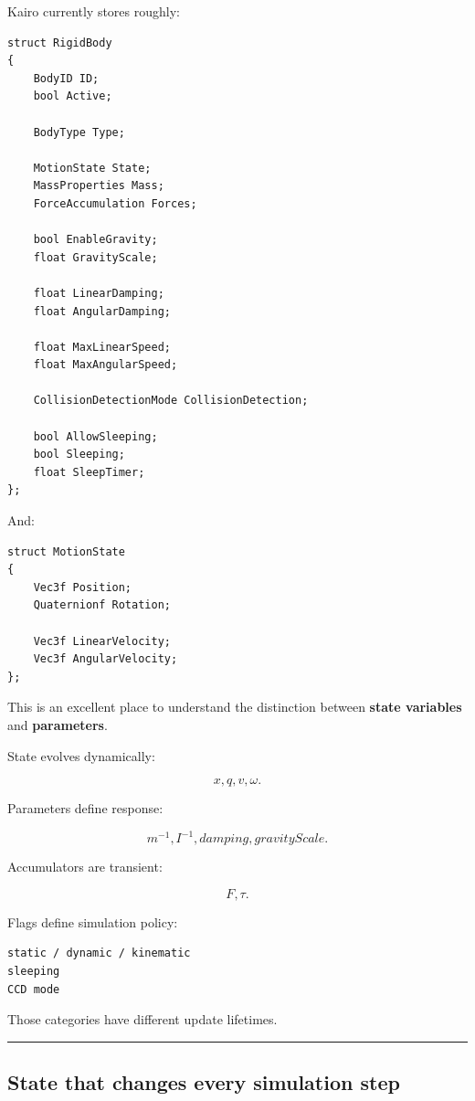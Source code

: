 Kairo currently stores roughly:

\begin{verbatim}
struct RigidBody
{
    BodyID ID;
    bool Active;

    BodyType Type;

    MotionState State;
    MassProperties Mass;
    ForceAccumulation Forces;

    bool EnableGravity;
    float GravityScale;

    float LinearDamping;
    float AngularDamping;

    float MaxLinearSpeed;
    float MaxAngularSpeed;

    CollisionDetectionMode CollisionDetection;

    bool AllowSleeping;
    bool Sleeping;
    float SleepTimer;
};
\end{verbatim}

And:

\begin{verbatim}
struct MotionState
{
    Vec3f Position;
    Quaternionf Rotation;

    Vec3f LinearVelocity;
    Vec3f AngularVelocity;
};
\end{verbatim}

This is an excellent place to understand the distinction between \textbf{state variables} and \textbf{parameters}.

State evolves dynamically:

\[
x,q,v,\omega.
\]

Parameters define response:

\[
m^{-1},I^{-1},damping,gravityScale.
\]

Accumulators are transient:

\[
F,\tau.
\]

Flags define simulation policy:

\begin{verbatim}
static / dynamic / kinematic
sleeping
CCD mode
\end{verbatim}

Those categories have different update lifetimes.

\begin{center}\rule{0.5\linewidth}{0.5pt}\end{center}

\subsection{State that changes every simulation step}\label{06-engine-ii-ch037-state-that-changes-every-simulation-step}

